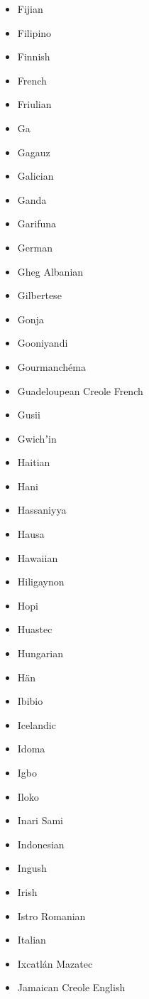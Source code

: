 \documentclass[paper=a4, 10pt]{scrbook}
\begin{document}
\begin{multicols}{3}
\begin{itemize}
        \item Fijian
        \item Filipino
        \item Finnish
        \item French
        \item Friulian
        \item Ga
        \item Gagauz
        \item Galician
        \item Ganda
        \item Garifuna
        \item German
        \item Gheg Albanian
        \item Gilbertese
        \item Gonja
        \item Gooniyandi
        \item Gourmanchéma
        \item Guadeloupean Creole French
        \item Gusii
        \item Gwichʼin
        \item Haitian
        \item Hani
        \item Hassaniyya
        \item Hausa
        \item Hawaiian
        \item Hiligaynon
        \item Hopi
        \item Huastec
        \item Hungarian
        \item Hän
        \item Ibibio
        \item Icelandic
        \item Idoma
        \item Igbo
        \item Iloko
        \item Inari Sami
        \item Indonesian
        \item Ingush
        \item Irish
        \item Istro Romanian
        \item Italian
        \item Ixcatlán Mazatec
        \item Jamaican Creole English

\end{itemize}
\end{multicols}
\end{document}
